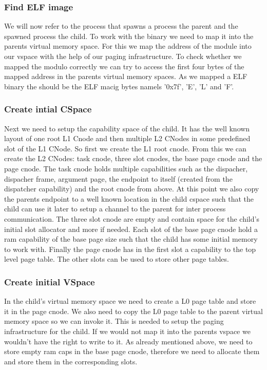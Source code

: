\subsubsection{Find ELF image}
We will now refer to the process that spawns a process the parent and the spawned process the child.
To work with the binary we need to map it into the parents virtual memory space. For this we map the address of the module into our vspace with the help of our paging infrastructure.
To check whether we mapped the modulo correctly we can try to access the first four bytes of the mapped address in the parents virtual memory spaces. As we mapped a ELF binary the should be the ELF macig bytes namels '0x7f', 'E', 'L' and 'F'.

\subsubsection{Create intial CSpace}
Next we need to setup the capability space of the child. It has the well known layout of one root L1 Cnode and then multiple L2 CNodes in some predefined slot of the L1 CNode.
So first we create the L1 root cnode. From this we can create the L2 CNodes: task cnode, three slot cnodes, the base page cnode and the page cnode.
The task cnode holds multiple capabilities such as the dispacher, dispacher frame, argument page, the endpoint to itself (created from the dispatcher capability) and the root cnode from above.
At this point we also copy the parents endpoint to a well known location in the child cspace such that the child can use it later to setup a channel to the parent for inter process communication.
The three slot cnode are empty and contain space for the child's initial slot allocator and more if needed.
Each slot of the base page cnode hold a ram capability of the base page size such that the child has some initial memory to work with.
Finally the page cnode has in the first slot a capability to the top level page table. The other slots can be used to store other page tables.

\subsubsection{Create initial VSpace}
In the child's virtual memory space we need to create a L0 page table and store it in the page cnode. We also need to copy the L0 page table to the parent virtual memory space so we can invoke it. This is needed to setup the paging infrastructure for the child. If we would not map it into the parents vspace we wouldn't have the right to write to it.
As already mentioned above, we need to store empty ram caps in the base page cnode, therefore we need to allocate them and store them in the corresponding slots.

